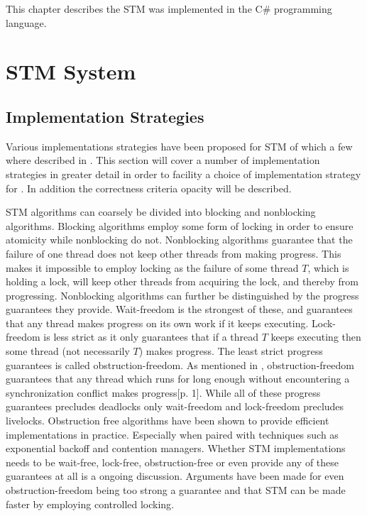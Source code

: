 \makeatletter {}\makeatother
{}
This chapter describes the \ac{STM} was implemented in the C\# programming language.
\label{chap:implementation}
\section{\acs{STM} System}
\subsection{Implementation Strategies}
Various implementations strategies have been proposed for \ac{STM} of which a few where described in . This section will cover a number of implementation strategies in greater detail in order to facility a choice of implementation strategy for \stmname. In addition the correctness criteria opacity will be described.

\ac{STM} algorithms can coarsely be divided into blocking and nonblocking algorithms\cite[p. 47]{harris2010transactional}. Blocking algorithms employ some form of locking in order to ensure atomicity while nonblocking do not\cite[p. 59]{herlihy2012art}. Nonblocking algorithms guarantee that the failure of one thread does not keep other threads from making progress\cite[p. 47]{harris2010transactional}\cite[p. 142]{herlihy1991wait}\cite[p. 59]{herlihy2012art}. This  makes it impossible to employ locking as the failure of some thread $T$, which is holding a lock, will keep other threads from acquiring the lock, and thereby from progressing. Nonblocking algorithms can further be distinguished by the progress guarantees they provide. Wait-freedom is the strongest of these, and guarantees that any thread makes progress on its own work if it keeps executing\cite[p. 124]{herlihy1991wait}\cite[p. 59]{herlihy2012art}. Lock-freedom is less strict as it only guarantees that if a thread $T$ keeps executing then some thread (not necessarily $T$) makes progress\cite[p. 47]{harris2010transactional}\cite[p. 60]{herlihy2012art}. The least strict progress guarantees is called obstruction-freedom\cite[p. 47]{harris2010transactional}\cite{herlihy2003obstruction}\cite[p. 61]{herlihy2012art}. As mentioned in , obstruction-freedom guarantees that any thread which runs for long enough without encountering a synchronization conflict makes progress\cite{herlihy2003obstruction}[p. 1]. While all of these progress guarantees precludes deadlocks only wait-freedom and lock-freedom precludes livelocks\cite[p. 47]{harris2010transactional}. Obstruction free algorithms have been shown to provide efficient implementations in practice\cite[p. 61]{herlihy2012art}. Especially when paired with techniques such as exponential backoff\cite[p. 147]{herlihy2012art} and contention managers\cite[p. 51]{harris2010transactional}.  Whether \ac{STM} implementations needs to be wait-free, lock-free, obstruction-free or even provide any of these guarantees at all is a ongoing discussion. Arguments have been made for even obstruction-freedom being too strong a guarantee and that \ac{STM} can be made faster by employing controlled locking\cite{ennals2006software}.

